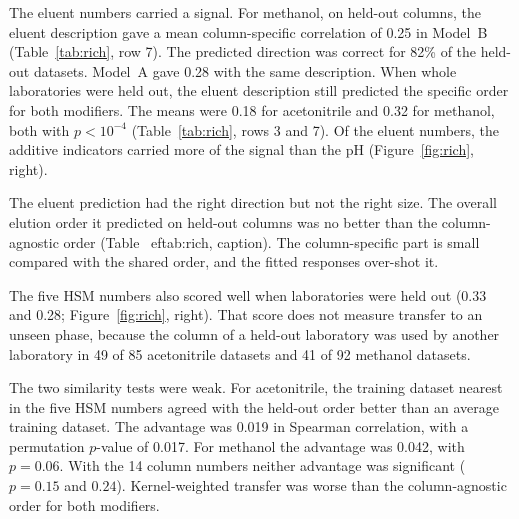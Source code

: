 \documentclass[11pt,a4paper]{article}
\theoremstyle{definition}
\theoremstyle{remark}
\begin{document}
The eluent numbers carried a signal.
For methanol, on held-out columns, the eluent description gave a mean column-specific correlation of 0.25 in Model~B (Table~\ref{tab:rich}, row 7).
The predicted direction was correct for 82\% of the held-out datasets.
Model~A gave 0.28 with the same description.
When whole laboratories were held out, the eluent description still predicted the specific order for both modifiers.
The means were 0.18 for acetonitrile and 0.32 for methanol, both with $p<10^{-4}$ (Table~\ref{tab:rich}, rows 3 and 7).
Of the eluent numbers, the additive indicators carried more of the signal than the pH (Figure~\ref{fig:rich}, right).

The eluent prediction had the right direction but not the right size.
The overall elution order it predicted on held-out columns was no better than the column-agnostic order (Table~
ef{tab:rich}, caption).
The column-specific part is small compared with the shared order, and the fitted responses over-shot it.

The five HSM numbers also scored well when laboratories were held out (0.33 and 0.28; Figure~\ref{fig:rich}, right).
That score does not measure transfer to an unseen phase, because the column of a held-out laboratory was used by another laboratory in 49 of 85 acetonitrile datasets and 41 of 92 methanol datasets.

The two similarity tests were weak.
For acetonitrile, the training dataset nearest in the five HSM numbers agreed with the held-out order better than an average training dataset.
The advantage was 0.019 in Spearman correlation, with a permutation $p$-value of 0.017.
For methanol the advantage was 0.042, with $p=0.06$.
With the 14 column numbers neither advantage was significant ($p=0.15$ and $0.24$).
Kernel-weighted transfer was worse than the column-agnostic order for both modifiers.
\end{document}
